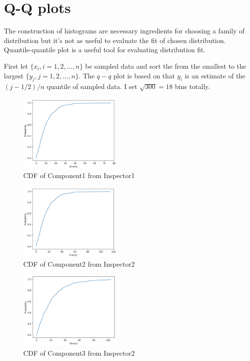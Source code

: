 \documentclass{article}
\begin{document}
\section{Q-Q plots}

The construction of histograms are necessary ingredients for choosing a family of distribution but it's not as useful to evaluate the fit of chosen distribution. Quantile-quantile plot is a useful tool for evaluating distribution fit.

First let ${\{x_i, i=1,2,...,n\}}$ be sampled data and sort the from the smallest to the largest ${\{y_j, j=1,2,...,n\}}$. The $q-q$ plot is based on that $y_i$ is an estimate of the $(j-1/2)/n$ quantile of sampled data. I set $\sqrt{300} = 18$ bins totally.

\begin{figure}[htbp]
\begin{center}
\includegraphics[width=2in]{cdf1.png}
\caption{CDF of Component1 from Inspector1}
\label{cdf1}
\end{center}
\end{figure}

\begin{figure}[htbp]
\begin{center}
\includegraphics[width=2in]{cdf2.png}
\caption{CDF of Component2 from Inspector2}
\label{cdf2}
\end{center}
\end{figure}

\begin{figure}[htbp]
\begin{center}
\includegraphics[width=2in]{cdf3.png}
\caption{CDF of Component3 from Inspector2}
\label{cdf3}
\end{center}
\end{figure}
\end{document}
